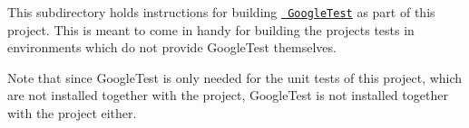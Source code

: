 This subdirectory holds instructions for building \href{https://github.com/google/googletest}{\texttt{ Google\+Test}} as part of this project. This is meant to come in handy for building the project\textquotesingle{}s tests in environments which do not provide Google\+Test themselves.

Note that since Google\+Test is only needed for the unit tests of this project, which are not installed together with the project, Google\+Test is not installed together with the project either. 
